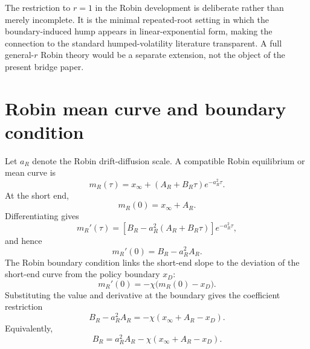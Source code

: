 \documentclass[11pt]{article}
\numberwithin{equation}{section}
\begin{document}
The restriction to $r=1$ in the Robin development is deliberate rather than merely incomplete. It is the minimal repeated-root setting in which the boundary-induced hump appears in linear-exponential form, making the connection to the standard humped-volatility literature transparent. A full general-$r$ Robin theory would be a separate extension, not the object of the present bridge paper.

\section{Robin mean curve and boundary condition}

Let $a_R$ denote the Robin drift-diffusion scale. A compatible Robin equilibrium or mean curve is
\begin{equation}
\label{eq:robin-mean-curve}
m_R(\tau)=x_\infty+(A_R+B_R\tau)e^{-a_R^2\tau}.
\end{equation}
At the short end,
\begin{equation}
m_R(0)=x_\infty+A_R.
\end{equation}
Differentiating gives
\begin{equation}
m_R'(\tau)=\left[B_R-a_R^2(A_R+B_R\tau)\right]e^{-a_R^2\tau},
\end{equation}
and hence
\begin{equation}
m_R'(0)=B_R-a_R^2A_R.
\end{equation}
The Robin boundary condition links the short-end slope to the deviation of the short-end curve from the policy boundary $x_D$:
\begin{equation}
m_R'(0)=-\chi\bigl(m_R(0)-x_D\bigr).
\end{equation}
Substituting the value and derivative at the boundary gives the coefficient restriction
\begin{equation}
B_R-a_R^2A_R=-\chi(x_\infty+A_R-x_D).
\end{equation}
Equivalently,
\begin{equation}
\label{eq:robin-boundary-coefficient}
B_R=a_R^2A_R-\chi(x_\infty+A_R-x_D).
\end{equation}
\end{document}
